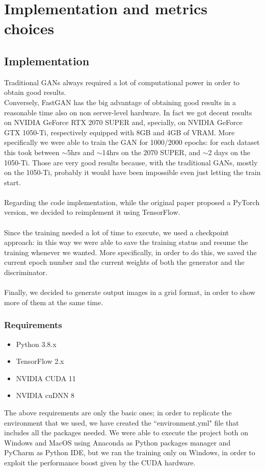 \documentclass[12pt]{article}
\begin{document}

\section{Implementation and metrics choices}
\large

\subsection{Implementation}

Traditional GANs always required a lot of computational power in order to obtain good results.\\
Conversely, FastGAN has the big advantage of obtaining good results in a reasonable time also on non server-level hardware.
In fact we got decent results on NVIDIA GeForce RTX 2070 SUPER and, specially, on NVIDIA GeForce GTX 1050-Ti, 
respectively equipped with 8GB and 4GB of VRAM. More specifically we were able to train the GAN for 1000/2000 epochs: for each dataset this
took between $\sim$5hrs and $\sim$14hrs on the 2070 SUPER, and $\sim$2 days on the 1050-Ti. Those are very good results because, with the traditional
GANs, mostly on the 1050-Ti, probably it would have been impossible even just letting the train start.\\\\
Regarding the code implementation, while the original paper proposed a PyTorch version, we decided to reimplement it using 
TensorFlow.\\\\
Since the training needed a lot of time to execute, we used a checkpoint approach: in this way 
we were able to save the training status and resume the training whenever we wanted. 
More specifically, in order to do this, we saved the current epoch number and the current weights of both the generator and
the discriminator.\\\\
Finally, we decided to generate output images in a grid format, in order to show more of them at the same time.


\subsubsection{Requirements}
\large

\begin{itemize}
	\item Python 3.8.x
	\item TensorFlow 2.x
	\item NVIDIA CUDA 11
	\item NVIDIA cuDNN 8
\end{itemize}
The above requirements are only the basic ones; in order to replicate the environment that we used, we have created
the ``environment.yml" file that includes all the packages needed.
We were able to execute the project both on Windows and MacOS using Anaconda as Python packages manager and PyCharm as Python IDE, 
but we ran the training only on Windows, in order to exploit the performance boost given by the CUDA hardware.
\end{document}
